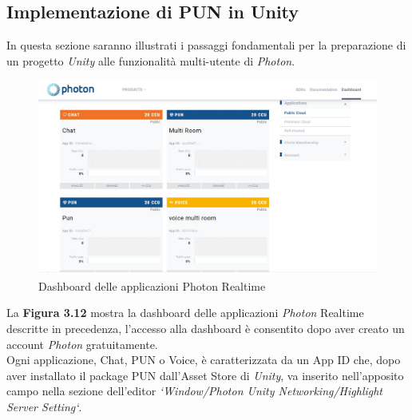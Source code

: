 \subsection{Implementazione di PUN in Unity}
In questa sezione saranno illustrati i passaggi fondamentali per la preparazione di un progetto \textit{Unity} alle funzionalità multi-utente di \textit{Photon}.
\begin{figure}[H]
    \centering
    \includegraphics[scale = 0.3]{Immagini/Sitophoton.jpg}
    \caption{Dashboard delle applicazioni Photon Realtime}
    \label{fig:my_label}
\end{figure}
\hspace{-0.6cm}La \textbf{Figura 3.12} mostra la dashboard delle applicazioni \textit{Photon} Realtime descritte in precedenza, l'accesso alla dashboard è consentito dopo aver creato un account \textit{Photon} gratuitamente.
\\Ogni applicazione, Chat, PUN o Voice, è caratterizzata da un App ID che, dopo aver installato il package PUN
dall'Asset Store di \textit{Unity}, va inserito nell'apposito campo nella sezione dell'editor \textit{`Window/Photon Unity Networking/Highlight Server Setting`}.
